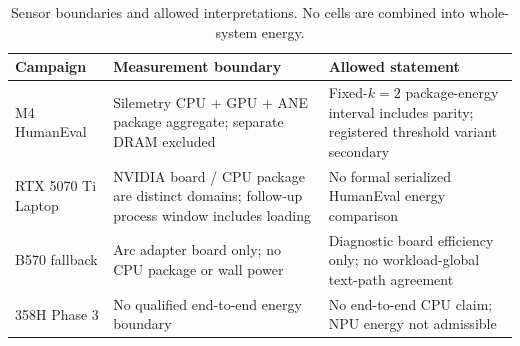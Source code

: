 \begin{table}[t]
\caption{Sensor boundaries and allowed interpretations. No cells are combined into whole-system energy.}
\label{tab:energy}
\centering
\begin{tabular}{>{\raggedright\arraybackslash}p{1.35in}>{\raggedright\arraybackslash}p{2.1in}>{\raggedright\arraybackslash}p{2.45in}}
\toprule
Campaign & Measurement boundary & Allowed statement \\
\midrule
M4 HumanEval & Silemetry CPU + GPU + ANE package aggregate; separate DRAM excluded & Fixed-$k=2$ package-energy interval includes parity; registered threshold variant secondary \\
RTX 5070 Ti Laptop & NVIDIA board / CPU package are distinct domains; follow-up process window includes loading & No formal serialized HumanEval energy comparison \\
B570 fallback & Arc adapter board only; no CPU package or wall power & Diagnostic board efficiency only; no workload-global text-path agreement \\
358H Phase 3 & No qualified end-to-end energy boundary & No end-to-end CPU claim; NPU energy not admissible \\
\bottomrule
\end{tabular}
\end{table}
